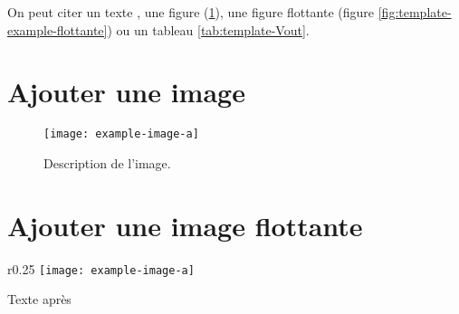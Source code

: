On peut citer
un texte \cite{boutin_en_2009},
une figure (\ref{fig:template-example-image}),
une figure flottante (figure \ref{fig:template-example-flottante}) ou
un tableau \ref{tab:template-Vout}.

\section{Ajouter une image}

\begin{figure}[h!]
    \centering
    \texttt{[image: example-image-a]}
    \caption{Description de l'image.}
    \label{fig:template-example-image}
\end{figure}

\section{Ajouter une image flottante}

\begin{wrapfigure}{r}{0.25\linewidth}
    \centering
    \texttt{[image: example-image-a]}
    \caption{Description de l'image.}
    \label{fig:template-example-flottante}
\end{wrapfigure}

Texte après
